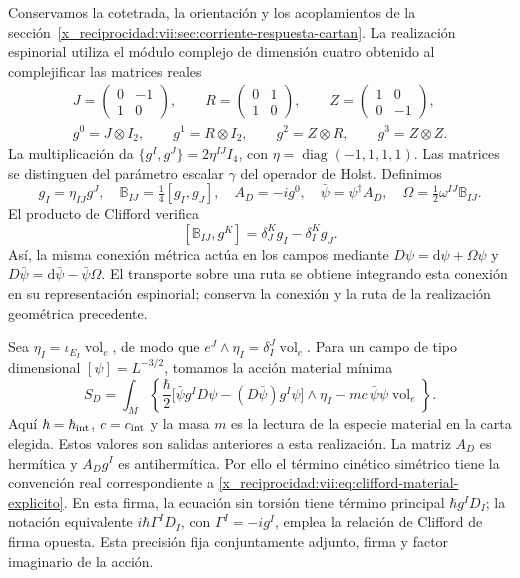 Conservamos la cotetrada, la orientación y los acoplamientos de la
sección~\ref{x_reciprocidad:vii:sec:corriente-respuesta-cartan}. La realización
espinorial utiliza el módulo complejo de dimensión cuatro obtenido al
complejificar las matrices reales
\begin{equation}
 \begin{gathered}
 J=\begin{pmatrix}0&-1\\1&0\end{pmatrix},\qquad
 R=\begin{pmatrix}0&1\\1&0\end{pmatrix},\qquad
 Z=\begin{pmatrix}1&0\\0&-1\end{pmatrix},\\
 g^0=J\otimes I_2,\qquad g^1=R\otimes I_2,\qquad
 g^2=Z\otimes R,\qquad g^3=Z\otimes Z.
 \end{gathered}
 \label{x_reciprocidad:vii:eq:clifford-material-explicito}
\end{equation}
La multiplicación da
\(\{g^I,g^J\}=2\eta^{IJ}I_4\), con
\(\eta=\operatorname{diag}(-1,1,1,1)\). Las matrices se distinguen
del parámetro escalar \(\gamma\) del operador de Holst. Definimos
\begin{equation}
 g_I=\eta_{IJ}g^J,\quad
 \mathbb B_{IJ}=\tfrac14[g_I,g_J],\quad
 A_D=-i g^0,\quad \bar\psi=\psi^\dagger A_D,\quad
 \Omega=\tfrac12\omega^{IJ}\mathbb B_{IJ}.
 \label{x_reciprocidad:vii:eq:adjunto-conexion-espinorial}
\end{equation}
El producto de Clifford verifica
\[
 [\mathbb B_{IJ},g^K]=\delta_J^K g_I-\delta_I^K g_J.
\]
Así, la misma conexión métrica actúa en los campos mediante
\(D\psi=\mathrm d\psi+\Omega\psi\) y
\(D\bar\psi=\mathrm d\bar\psi-\bar\psi\Omega\).
El transporte sobre una ruta se obtiene integrando esta conexión en
su representación espinorial; conserva la conexión y la ruta de la
realización geométrica precedente.

Sea \(\eta_I=\iota_{E_I}\operatorname{vol}_e\), de modo que
\(e^J\wedge\eta_I=\delta_I^J\operatorname{vol}_e\). Para un
campo de tipo dimensional \([\psi]=L^{-3/2}\), tomamos la acción
material mínima
\begin{equation}
 S_D=\int_M\left\{
 \frac{\hbar}{2}
 \bigl[\bar\psi g^I D\psi-(D\bar\psi)g^I\psi\bigr]\wedge\eta_I
 -mc\,\bar\psi\psi\operatorname{vol}_e\right\}.
 \label{x_reciprocidad:vii:eq:accion-dirac-material}
\end{equation}
Aquí \(\hbar=\hbar_{\rm int}\), \(c=c_{\rm int}\) y la masa
\(m\) es la lectura de la especie material en la carta elegida.
Estos valores son salidas anteriores a esta realización. La matriz
\(A_D\) es hermítica y \(A_Dg^I\) es antihermítica. Por ello el
término cinético simétrico tiene la convención real correspondiente a
\eqref{x_reciprocidad:vii:eq:clifford-material-explicito}. En esta firma, la ecuación
sin torsión tiene término principal \(\hbar g^I D_I\); la notación
equivalente \(i\hbar\Gamma^I D_I\), con \(\Gamma^I=-i g^I\),
emplea la relación de Clifford de firma opuesta. Esta precisión fija
conjuntamente adjunto, firma y factor imaginario de la acción.

